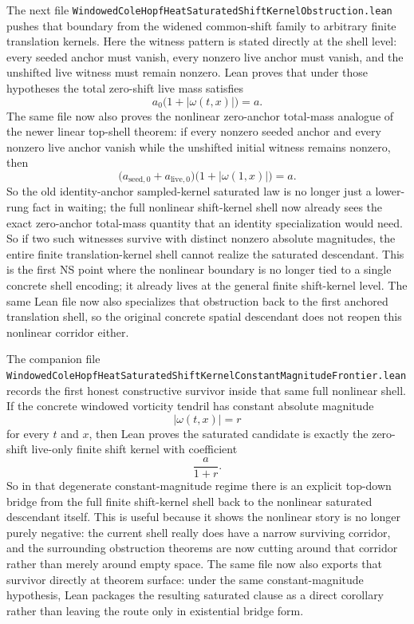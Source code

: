 \documentclass[11pt]{article}
\begin{document}
The next file
\texttt{WindowedColeHopfHeatSaturatedShiftKernelObstruction.lean} pushes that
boundary from the widened common-shift family to arbitrary finite translation
kernels.  Here the witness pattern is stated directly at the shell level:
every seeded anchor must vanish, every nonzero live anchor must vanish, and the
unshifted live witness must remain nonzero.  Lean proves that under those
hypotheses the total zero-shift live mass satisfies
\[
  a_{0} \bigl(1 + |\omega(t,x)|\bigr) = a.
\]
The same file now also proves the nonlinear zero-anchor total-mass analogue of
the newer linear top-shell theorem: if every nonzero seeded anchor and every
nonzero live anchor vanish while the unshifted initial witness remains nonzero,
then
\[
  \bigl(a_{\mathrm{seed},0} + a_{\mathrm{live},0}\bigr)
  \bigl(1 + |\omega(1,x)|\bigr) = a.
\]
So the old identity-anchor sampled-kernel saturated law is no longer just a
lower-rung fact in waiting; the full nonlinear shift-kernel shell now already
sees the exact zero-anchor total-mass quantity that an identity specialization
would need.
So if two such witnesses survive with distinct nonzero absolute magnitudes, the
entire finite translation-kernel shell cannot realize the saturated descendant.
This is the first NS point where the nonlinear boundary is no longer tied to a
single concrete shell encoding; it already lives at the general finite
shift-kernel level.  The same Lean file now also specializes that obstruction
back to the first anchored translation shell, so the original concrete spatial
descendant does not reopen this nonlinear corridor either.

The companion file
\texttt{WindowedColeHopfHeatSaturatedShiftKernelConstantMagnitudeFrontier.lean}
records the first honest constructive survivor inside that same full nonlinear
shell.  If the concrete windowed vorticity tendril has constant absolute
magnitude
\[
  |\omega(t,x)| = r
\]
for every \(t\) and \(x\), then Lean proves the saturated candidate is exactly
the zero-shift live-only finite shift kernel with coefficient
\[
  \frac{a}{1+r}.
\]
So in that degenerate constant-magnitude regime there is an explicit
top-down bridge from the full finite shift-kernel shell back to the nonlinear
saturated descendant itself.  This is useful because it shows the nonlinear
story is no longer purely negative: the current shell really does have a narrow
surviving corridor, and the surrounding obstruction theorems are now cutting
around that corridor rather than merely around empty space.  The same file now
also exports that survivor directly at theorem surface: under the same
constant-magnitude hypothesis, Lean packages the resulting saturated clause as a
direct corollary rather than leaving the route only in existential bridge form.
\end{document}
